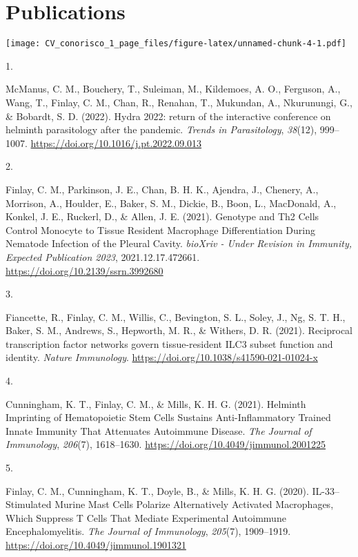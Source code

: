 \documentclass[8pt,a4paper,]{awesome-cv}
\newlength{\csllabelwidth}
\newcommand{\CSLLeftMargin}[1]{\parbox[t]{\csllabelwidth}{#1}}
\newcommand{\CSLRightInline}[1]{\parbox[t]{\linewidth - \csllabelwidth}{#1}}
\begin{document}
\newpage

\hypertarget{publications}{%
\section{Publications}\label{publications}}

\texttt{[image: CV\_conorisco\_1\_page\_files/figure-latex/unnamed-chunk-4-1.pdf]}

\hypertarget{bibliography}{}
\leavevmode{}%
\CSLLeftMargin{1. }%
\CSLRightInline{McManus, C. M., Bouchery, T., Suleiman, M., Kildemoes,
A. O., Ferguson, A., Wang, T., Finlay, C. M., Chan, R., Renahan, T.,
Mukundan, A., Nkurunungi, G., \& Bobardt, S. D. (2022). Hydra 2022:
return of the interactive conference on helminth parasitology after the
pandemic. \emph{Trends in Parasitology}, \emph{38}(12), 999--1007.
\url{https://doi.org/10.1016/j.pt.2022.09.013}}

\leavevmode{}%
\CSLLeftMargin{2. }%
\CSLRightInline{Finlay, C. M., Parkinson, J. E., Chan, B. H. K.,
Ajendra, J., Chenery, A., Morrison, A., Houlder, E., Baker, S. M.,
Dickie, B., Boon, L., MacDonald, A., Konkel, J. E., Ruckerl, D., \&
Allen, J. E. (2021). Genotype and Th2 Cells Control Monocyte to Tissue
Resident Macrophage Differentiation During Nematode Infection of the
Pleural Cavity. \emph{bioXriv - Under Revision in Immunity, Expected
Publication 2023}, 2021.12.17.472661.
\url{https://doi.org/10.2139/ssrn.3992680}}

\leavevmode{}%
\CSLLeftMargin{3. }%
\CSLRightInline{Fiancette, R., Finlay, C. M., Willis, C., Bevington, S.
L., Soley, J., Ng, S. T. H., Baker, S. M., Andrews, S., Hepworth, M. R.,
\& Withers, D. R. (2021). Reciprocal transcription factor networks
govern tissue-resident ILC3 subset function and identity. \emph{Nature
Immunology}. \url{https://doi.org/10.1038/s41590-021-01024-x}}

\leavevmode{}%
\CSLLeftMargin{4. }%
\CSLRightInline{Cunningham, K. T., Finlay, C. M., \& Mills, K. H. G.
(2021). Helminth Imprinting of Hematopoietic Stem Cells Sustains
Anti-Inflammatory Trained Innate Immunity That Attenuates Autoimmune
Disease. \emph{The Journal of Immunology}, \emph{206}(7), 1618--1630.
\url{https://doi.org/10.4049/jimmunol.2001225}}

\leavevmode{}%
\CSLLeftMargin{5. }%
\CSLRightInline{Finlay, C. M., Cunningham, K. T., Doyle, B., \& Mills,
K. H. G. (2020). IL-33--Stimulated Murine Mast Cells Polarize
Alternatively Activated Macrophages, Which Suppress T Cells That Mediate
Experimental Autoimmune Encephalomyelitis. \emph{The Journal of
Immunology}, \emph{205}(7), 1909--1919.
\url{https://doi.org/10.4049/jimmunol.1901321}}
\end{document}
